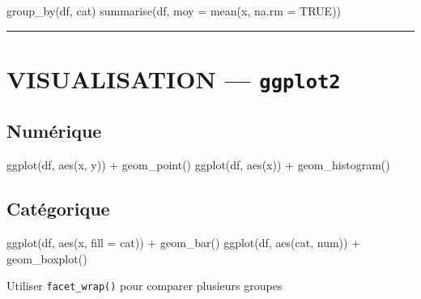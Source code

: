 \documentclass[
  8pt,
  letterpaper,
  DIV=11,
  numbers=noendperiod]{scrartcl}
\newenvironment{Shaded}{\begin{snugshade}}{\end{snugshade}}
\newcommand{\AttributeTok}[1]{\textcolor[rgb]{0.40,0.45,0.13}{#1}}
\newcommand{\ConstantTok}[1]{\textcolor[rgb]{0.56,0.35,0.01}{#1}}
\newcommand{\FunctionTok}[1]{\textcolor[rgb]{0.28,0.35,0.67}{#1}}
\newcommand{\NormalTok}[1]{\textcolor[rgb]{0.00,0.23,0.31}{#1}}
\newcommand{\SpecialCharTok}[1]{\textcolor[rgb]{0.37,0.37,0.37}{#1}}
\begin{document}
\begin{Shaded}
\begin{Highlighting}[]
\FunctionTok{group\_by}\NormalTok{(df, cat)}
\FunctionTok{summarise}\NormalTok{(df, }\AttributeTok{moy =} \FunctionTok{mean}\NormalTok{(x, }\AttributeTok{na.rm =} \ConstantTok{TRUE}\NormalTok{))}
\end{Highlighting}
\end{Shaded}

\begin{center}\rule{0.5\linewidth}{0.5pt}\end{center}

\section{\texorpdfstring{VISUALISATION ---
\texttt{ggplot2}}{VISUALISATION --- ggplot2}}\label{visualisation-ggplot2}

\subsection{Numérique}\label{numuxe9rique}

\begin{Shaded}
\begin{Highlighting}[]
\FunctionTok{ggplot}\NormalTok{(df, }\FunctionTok{aes}\NormalTok{(x, y)) }\SpecialCharTok{+} \FunctionTok{geom\_point}\NormalTok{()}
\FunctionTok{ggplot}\NormalTok{(df, }\FunctionTok{aes}\NormalTok{(x)) }\SpecialCharTok{+} \FunctionTok{geom\_histogram}\NormalTok{()}
\end{Highlighting}
\end{Shaded}

\subsection{Catégorique}\label{catuxe9gorique}

\begin{Shaded}
\begin{Highlighting}[]
\FunctionTok{ggplot}\NormalTok{(df, }\FunctionTok{aes}\NormalTok{(x, }\AttributeTok{fill =}\NormalTok{ cat)) }\SpecialCharTok{+} \FunctionTok{geom\_bar}\NormalTok{()}
\FunctionTok{ggplot}\NormalTok{(df, }\FunctionTok{aes}\NormalTok{(cat, num)) }\SpecialCharTok{+} \FunctionTok{geom\_boxplot}\NormalTok{()}
\end{Highlighting}
\end{Shaded}

Utiliser \texttt{facet\_wrap()} pour comparer plusieurs groupes
\end{document}
